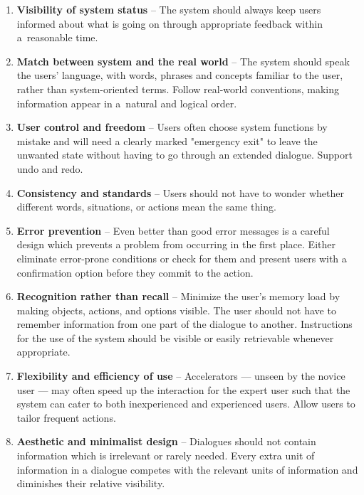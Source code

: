 \begin{enumerate}
    \item \textbf{Visibility of system status} -- The system should always keep users informed about what is going on through appropriate feedback within a~reasonable time. 
    
    \item \textbf{Match between system and the real world} -- The system should speak the users' language, with words, phrases and concepts familiar to the user, rather than system-oriented terms. Follow real-world conventions, making information appear in a~natural and logical order.
    
    \item \textbf{User control and freedom} -- Users often choose system functions by mistake and will need a clearly marked "emergency exit" to leave the unwanted state without having to go through an extended dialogue. Support undo and redo.
    
    \item \textbf{Consistency and standards} -- Users should not have to wonder whether different words, situations, or actions mean the same thing.
    
    \item \textbf{Error prevention} -- Even better than good error messages is a careful design which prevents a problem from occurring in the first place. Either eliminate error-prone conditions or check for them and present users with a confirmation option before they commit to the action.
    
    \item \textbf{Recognition rather than recall} -- Minimize the user's memory load by making objects, actions, and options visible. The user should not have to remember information from one part of the dialogue to another. Instructions for the use of the system should be visible or easily retrievable whenever appropriate.
    
    \item \textbf{Flexibility and efficiency of use} -- Accelerators — unseen by the novice user — may often speed up the interaction for the expert user such that the system can cater to both inexperienced and experienced users. Allow users to tailor frequent actions.
    
    \item \textbf{Aesthetic and minimalist design} -- Dialogues should not contain information which is irrelevant or rarely needed. Every extra unit of information in a dialogue competes with the relevant units of information and diminishes their relative visibility.
    

\end{enumerate}
